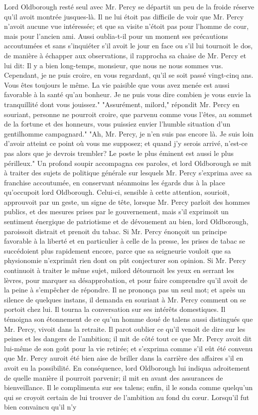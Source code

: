 Lord Oldborough resté seul avec Mr. Percy se départit un peu de la froide réserve qu'il avoit montrée jusques-là. Il ne lui étoit pas difficile de voir que Mr. Percy n'avoit aucune vue intéressée; et que sa visite n'étoit pas pour l'homme de cour, mais pour l'ancien ami. Aussi oublia-t-il pour un moment ses précautions accoutumées et sans s'inquiéter s'il avoit le jour en face ou s'il lui tournoit le dos, de manière à échapper aux observations, il rapprocha sa chaise de Mr. Percy et lui dit: Il y a bien long-temps, monsieur, que nous ne nous sommes vus. Cependant, je ne puis croire, en vous regardant, qu'il se soit passé vingt-cinq ans. Vous êtes toujours le même. La vie paisible que vous avez menée est aussi favorable à la santé qu'au bonheur. Je ne puis vous dire combien je vous envie la tranquillité dont vous jouissez."
"Assurément, milord," répondit Mr. Percy en souriant, personne ne pourroit croire, que parvenu comme vous l'êtes, au sommet de la fortune et des honneurs, vous puissiez envier l'humble situation d'un gentilhomme campagnard."\setcounter{page}{515} "Ah, Mr. Percy, je n'en suis pas encore là. Je suis loin d'avoir atteint ce point où vous me supposez; et quand j'y serois arrivé, n'est-ce pas alors que je devrois trembler? Le poste le plus éminent est aussi le plus périlleux." Un profond soupir accompagna ces paroles, et lord Oldborough se mit à traiter des sujets de politique générale sur lesquels Mr. Percy s'exprima avec sa franchise accoutumée, en conservant néanmoins les égards dus à la place qu'occupoit lord Oldborough. Celui-ci, sensible à cette attention, sourioit, approuvoit par un geste, un signe de tête, lorsque Mr. Percy parloit des hommes publics, et des mesures prises par le gouvernement, mais s'il exprimoit un sentiment énergique de patriotisme et de dévouement au bien, lord Oldborough, paroissoit distrait et prenoit du tabac. Si Mr. Percy énonçoit un principe favorable à la liberté et en particulier à celle de la presse, les prises de tabac se succédoient plus rapidement encore, parce que sa seigneurie vouloit que sa physionomie n'exprimât rien dont on pût conjecturer son opinion. Si Mr. Percy continuoit à traiter le même sujet, milord détournoit les yeux en serrant les lèvres, pour marquer sa désapprobation, et pour faire comprendre qu'il avoit de la peine\setcounter{page}{516} à s'empêcher de répondre. Il ne prononça pas un seul mot; et après un silence de quelques instans, il demanda en souriant à Mr. Percy comment on se portoit chez lui. Il tourna la conversation sur ses intérêts domestiques. Il témoigna son étonnement de ce qu'un homme doué de talens aussi distingués que Mr. Percy, vivoit dans la retraite. Il parot oublier ce qu'il venoit de dire sur les peines et les dangers de l'ambition; il mit de côté tout ce que Mr. Percy avoit dit lui-même de son goût pour la vie retirée; et s'exprima comme s'il eût été convenu que Mr. Percy auroit été bien aise de briller dans la carrière des affaires s'il en avoit eu la possibilité. En conséquence, lord Oldborough lui indiqua adroitement de quelle manière il pourroit parvenir; il mit en avant des assurances de bienveillance. Il le complimenta sur ses talens; enfin, il le sonda comme quelqu'un qui se croyoit certain de lui trouver de l'ambition au fond du cœur. Lorsqu'il fut bien convaincu qu'il n'y 